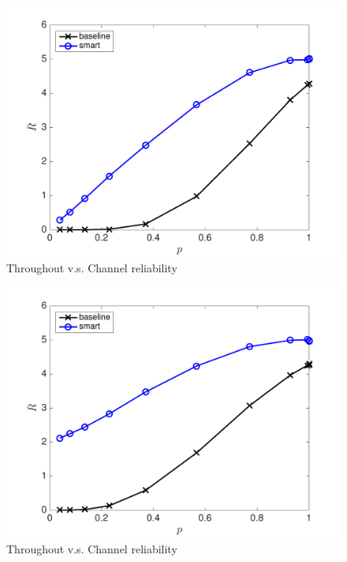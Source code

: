 \documentclass{article}
\begin{document}
\begin{figure}[htbp]
\centering
\includegraphics[scale=0.5]{R_p_sym.pdf}
\caption{Throughout v.s. Channel reliability}
\label{smart and baseline sym}
\end{figure}

\begin{figure}[htbp]
\centering
\includegraphics[scale=0.5]{R_p_asym.pdf}
\caption{Throughout v.s. Channel reliability}
\label{smart and baseline asym}
\end{figure}
\end{document}
